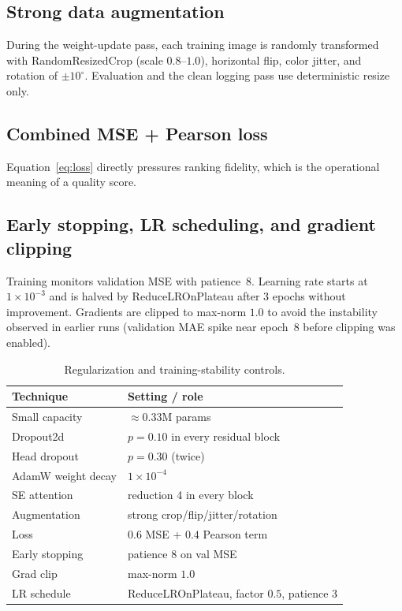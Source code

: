 \documentclass[12pt, letterpaper, titlepage]{article}
\newcommand{\TableHere}[1][0.34\textheight]{%
  \Needspace{#1}%
  \begin{table}[H]%
}
\begin{document}
\subsection{Strong data augmentation}
During the weight-update pass, each training image is randomly transformed with RandomResizedCrop (scale $0.8$--$1.0$), horizontal flip, color jitter, and rotation of $\pm 10^\circ$. Evaluation and the clean logging pass use deterministic resize only.

\subsection{Combined MSE + Pearson loss}
Equation~\eqref{eq:loss} directly pressures ranking fidelity, which is the operational meaning of a quality score.

\subsection{Early stopping, LR scheduling, and gradient clipping}
Training monitors validation MSE with patience~8. Learning rate starts at $1\times 10^{-3}$ and is halved by ReduceLROnPlateau after 3 epochs without improvement. Gradients are clipped to max-norm $1.0$ to avoid the instability observed in earlier runs (validation MAE spike near epoch~8 before clipping was enabled).

\TableHere[12\baselineskip]
\caption{Regularization and training-stability controls.}
\label{tab:reg}
\centering
\footnotesize
\begin{tabularx}{\textwidth}{|L{0.30\textwidth}|Y|}
\hline
\textbf{Technique} & \textbf{Setting / role} \\
\hline
Small capacity & $\approx 0.33$M params \\
\hline
Dropout2d & $p=0.10$ in every residual block \\
\hline
Head dropout & $p=0.30$ (twice) \\
\hline
AdamW weight decay & $1\times 10^{-4}$ \\
\hline
SE attention & reduction 4 in every block \\
\hline
Augmentation & strong crop/flip/jitter/rotation \\
\hline
Loss & $0.6$ MSE + $0.4$ Pearson term \\
\hline
Early stopping & patience 8 on val MSE \\
\hline
Grad clip & max-norm $1.0$ \\
\hline
LR schedule & ReduceLROnPlateau, factor $0.5$, patience 3 \\
\hline
\end{tabularx}
\end{table}
\end{document}
